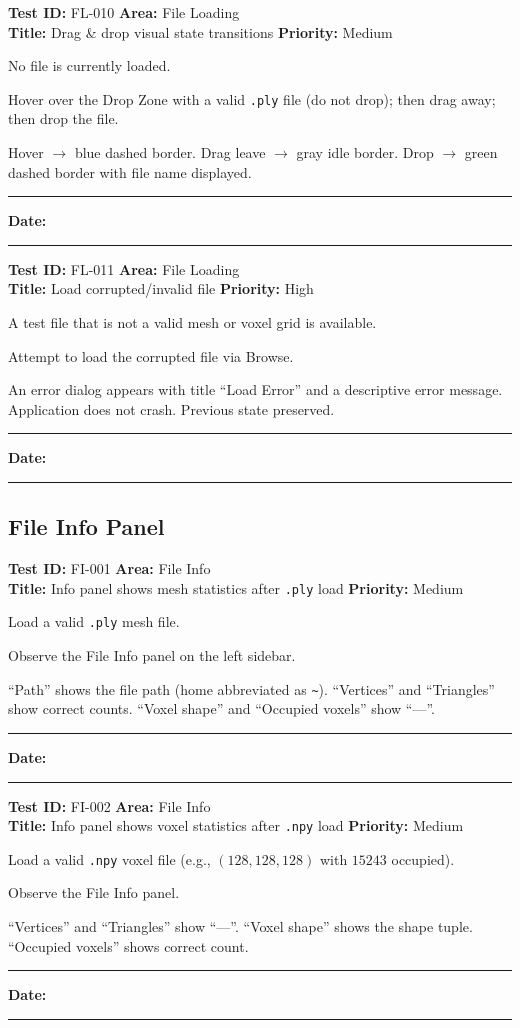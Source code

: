 \documentclass[12pt,a4paper]{article}
\newenvironment{testcase}[4]{%
  \smallskip
  \noindent\textbf{Test ID:} #1 \hfill \textbf{Area:} #2 \\
  \textbf{Title:} #3 \hfill \textbf{Priority:} #4
  \begin{description}[leftmargin=2em,style=nextline]
    \item[\textbf{Preconditions:}]
}{%
    \item[\textbf{Steps:}]
    \item[\textbf{Expected Result:}]
    \item[\textbf{Status:}] \rule{3cm}{0.4pt} \hspace{1em} \textbf{Date:} \rule{3cm}{0.4pt}
    \item[\textbf{Notes:}]
  \end{description}
  \smallskip
}
\begin{document}
\begin{testcase}{FL-010}{File Loading}{Drag \& drop visual state transitions}{Medium}
  \item No file is currently loaded.
  \item Hover over the Drop Zone with a valid \texttt{.ply} file (do not drop); then drag away; then drop the file.
  \item Hover $\rightarrow$ blue dashed border. Drag leave $\rightarrow$ gray idle border. Drop $\rightarrow$ green dashed border with file name displayed.
\end{testcase}

\begin{testcase}{FL-011}{File Loading}{Load corrupted/invalid file}{High}
  \item A test file that is not a valid mesh or voxel grid is available.
  \item Attempt to load the corrupted file via Browse.
  \item An error dialog appears with title ``Load Error'' and a descriptive error message. Application does not crash. Previous state preserved.
\end{testcase}

\subsection{File Info Panel}

\begin{testcase}{FI-001}{File Info}{Info panel shows mesh statistics after \texttt{.ply} load}{Medium}
  \item Load a valid \texttt{.ply} mesh file.
  \item Observe the File Info panel on the left sidebar.
  \item ``Path'' shows the file path (home abbreviated as \texttt{\~{}}). ``Vertices'' and ``Triangles'' show correct counts. ``Voxel shape'' and ``Occupied voxels'' show ``---''.
\end{testcase}

\begin{testcase}{FI-002}{File Info}{Info panel shows voxel statistics after \texttt{.npy} load}{Medium}
  \item Load a valid \texttt{.npy} voxel file (e.g., $(128,128,128)$ with $15243$ occupied).
  \item Observe the File Info panel.
  \item ``Vertices'' and ``Triangles'' show ``---''. ``Voxel shape'' shows the shape tuple. ``Occupied voxels'' shows correct count.
\end{testcase}
\end{document}
